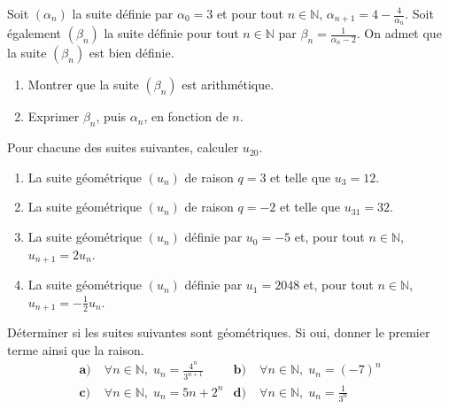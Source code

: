 \documentclass[11pt]{article}
\begin{document}
\begin{exo}
  Soit $\left( \alpha_n \right)$ la suite définie par $\alpha_0 = 3$ et pour
  tout $n\in\mathbb{N}$, $\alpha_{n+1}=4-\frac{4}{\alpha_n}$. Soit également
  $\left( \beta_n \right)$ la suite définie pour tout $n\in\mathbb{N}$ par
  $\beta_n = \frac{1}{\alpha_n-2}$. On admet que la suite $\left( \beta_n
  \right)$ est bien définie.
  \begin{enumerate}
    \item Montrer que la suite $\left( \beta_n \right)$ est arithmétique.
    \item Exprimer $\beta_n$, puis $\alpha_n$, en fonction de $n$.
  \end{enumerate}
\end{exo}

\begin{exo}
  Pour chacune des suites suivantes, calculer $u_{20}$.
  \begin{enumerate}
    \item La suite géométrique $\left( u_n \right)$ de raison $q=3$ et telle
      que $u_3=12$.
    \item La suite géométrique $\left( u_n \right)$ de raison $q=-2$ et telle
      que $u_{31}=32$.
    \item La suite géométrique $\left( u_n \right)$ définie par $u_0=-5$ et,
      pour tout $n\in\mathbb{N}$, $u_{n+1}=2u_n$.
    \item La suite géométrique $\left( u_n \right)$ définie par $u_1=2048$ et,
      pour tout $n\in\mathbb{N}$, $u_{n+1}=-\frac{1}{2}u_n$.
  \end{enumerate}
\end{exo}

\begin{exo}
  Déterminer si les suites suivantes sont géométriques. Si oui, donner le
  premier terme ainsi que la raison.
  \begin{align*}
    \textbf{a)}\;& \forall n\in\mathbb{N},\; u_n = \frac{4^n}{3^{n+1}} &
    \textbf{b)}\;& \forall n\in\mathbb{N},\; u_n = \left( -7 \right)^n \\
    \textbf{c)}\;& \forall n\in\mathbb{N},\; u_n = 5n+2^n &
    \textbf{d)}\;& \forall n\in\mathbb{N},\; u_n = \frac{1}{3^n}
  \end{align*}
\end{exo}
\end{document}
